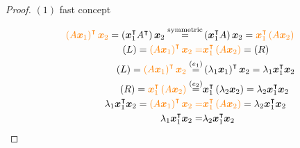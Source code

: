 \documentclass[
]{book}
\theoremstyle{definition}
\theoremstyle{definition}
\theoremstyle{definition}
\theoremstyle{definition}
\theoremstyle{remark}
\begin{document}
\begin{proof}

\(\left(1\right)\) fast concept

\[
\begin{aligned}
{\color{orange}\left(A\boldsymbol{x}_{1}\right)^{\intercal}\boldsymbol{x}_{2}}=\left(\boldsymbol{x}_{1}^{\intercal}A^{\intercal}\right)\boldsymbol{x}_{2}\overset{\text{symmetric}}{=} & \left(\boldsymbol{x}_{1}^{\intercal}A\right)\boldsymbol{x}_{2}={\color{orange}\boldsymbol{x}_{1}^{\intercal}\left(A\boldsymbol{x}_{2}\right)}\\
\left(L\right)={\color{orange}\left(A\boldsymbol{x}_{1}\right)^{\intercal}\boldsymbol{x}_{2}=} & {\color{orange}\boldsymbol{x}_{1}^{\intercal}\left(A\boldsymbol{x}_{2}\right)}=\left(R\right)\\
\left(L\right)={\color{orange}\left(A\boldsymbol{x}_{1}\right)^{\intercal}\boldsymbol{x}_{2}}\overset{\left(e_{1}\right)}{=} & \left(\lambda_{1}\boldsymbol{x}_{1}\right)^{\intercal}\boldsymbol{x}_{2}=\lambda_{1}\boldsymbol{x}_{1}^{\intercal}\boldsymbol{x}_{2}\\
\left(R\right)={\color{orange}\boldsymbol{x}_{1}^{\intercal}\left(A\boldsymbol{x}_{2}\right)}\overset{\left(e_{2}\right)}{=} & \boldsymbol{x}_{1}^{\intercal}\left(\lambda_{2}\boldsymbol{x}_{2}\right)=\lambda_{2}\boldsymbol{x}_{1}^{\intercal}\boldsymbol{x}_{2}\\
\lambda_{1}\boldsymbol{x}_{1}^{\intercal}\boldsymbol{x}_{2}={\color{orange}\left(A\boldsymbol{x}_{1}\right)^{\intercal}\boldsymbol{x}_{2}=} & {\color{orange}\boldsymbol{x}_{1}^{\intercal}\left(A\boldsymbol{x}_{2}\right)}=\lambda_{2}\boldsymbol{x}_{1}^{\intercal}\boldsymbol{x}_{2}\\
\lambda_{1}\boldsymbol{x}_{1}^{\intercal}\boldsymbol{x}_{2}= & \lambda_{2}\boldsymbol{x}_{1}^{\intercal}\boldsymbol{x}_{2}
\end{aligned}
\]

\end{proof}
\end{document}
